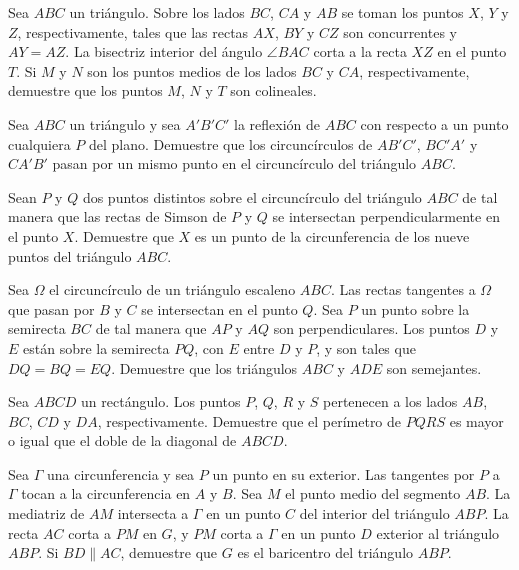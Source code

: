 \begin{probEG}
	Sea $ABC$ un triángulo. Sobre los lados $BC$, $CA$ y $AB$ se toman los puntos $X$, $Y$ y $Z$, respectivamente, tales que las rectas $AX$, $BY$ y $CZ$ son concurrentes y $AY=AZ$. La bisectriz interior del ángulo $\angle BAC$ corta a la recta $XZ$ en el punto $T$. Si $M$ y $N$ son los puntos medios de los lados $BC$ y $CA$, respectivamente, demuestre que los puntos $M$, $N$ y $T$ son colineales.
\end{probEG}

\begin{probEG}
	Sea $ABC$ un triángulo y sea $A'B'C'$ la reflexión de $ABC$ con respecto a un punto cualquiera $P$ del plano. Demuestre que los circuncírculos de $AB'C'$, $BC'A'$ y $CA'B'$ pasan por un mismo punto en el circuncírculo del triángulo $ABC$.
\end{probEG}

\begin{probEG}
	Sean $P$ y $Q$ dos puntos distintos sobre el circuncírculo del triángulo $ABC$ de tal manera que las rectas de Simson de $P$ y $Q$ se intersectan perpendicularmente en el punto $X$. Demuestre que $X$ es un punto de la circunferencia de los nueve puntos del triángulo $ABC$.
\end{probEG}

\begin{probEG}
	Sea $\Omega$ el circuncírculo de un triángulo escaleno $ABC$. Las rectas tangentes a $\Omega$ que pasan por $B$ y $C$ se intersectan en el punto $Q$. Sea $P$ un punto sobre la semirecta $BC$ de tal manera que $AP$ y $AQ$ son perpendiculares. Los puntos $D$ y $E$ están sobre la semirecta $PQ$, con $E$ entre $D$ y $P$, y son tales que $DQ=BQ=EQ$. Demuestre que los triángulos $ABC$ y $ADE$ son semejantes.
\end{probEG}

\begin{probEG}
	Sea $ABCD$ un rectángulo. Los puntos $P$, $Q$, $R$ y $S$ pertenecen a los lados $AB$, $BC$, $CD$ y $DA$, respectivamente. Demuestre que el perímetro de $PQRS$ es mayor o igual que el doble de la diagonal de $ABCD$.
\end{probEG}

\begin{probEG}
	Sea $\Gamma$ una circunferencia y sea $P$ un punto en su exterior. Las tangentes por $P$ a $\Gamma$ tocan a la circunferencia en $A$ y $B$. Sea $M$ el punto medio del segmento $AB$. La mediatriz de $AM$ intersecta a $\Gamma$ en un punto $C$ del interior del triángulo $ABP$. La recta $AC$ corta a $PM$ en $G$, y $PM$ corta a $\Gamma$ en un punto $D$ exterior al triángulo $ABP$. Si $BD\parallel AC$, demuestre que $G$ es el baricentro del triángulo $ABP$.
\end{probEG}

